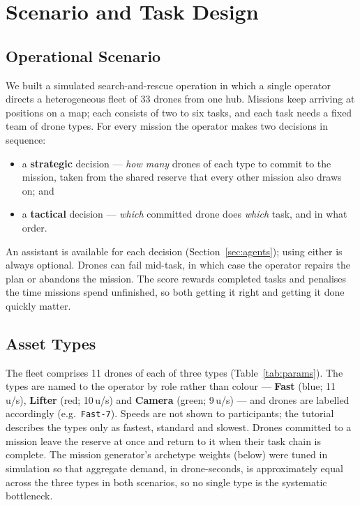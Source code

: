 \documentclass[10pt]{article}
\theoremstyle{definition}
\begin{document}
\section{Scenario and Task Design}\label{sec:task}

\subsection{Operational Scenario}

We built a simulated search-and-rescue operation in which a single operator directs a heterogeneous fleet of 33
drones from one hub. Missions keep arriving at positions on a map; each consists of two to six tasks, and each task
needs a fixed team of drone types. For every mission the operator makes two decisions in sequence:
\begin{itemize}[noitemsep]
  \item a \textbf{strategic} decision --- \emph{how many} drones of each type to commit to the mission, taken from
        the shared reserve that every other mission also draws on; and
  \item a \textbf{tactical} decision --- \emph{which} committed drone does \emph{which} task, and in what order.
\end{itemize}
An assistant is available for each decision (Section~\ref{sec:agents}); using either is always optional. Drones can
fail mid-task, in which case the operator repairs the plan or abandons the mission. The score rewards completed tasks
and penalises the time missions spend unfinished, so both getting it right and getting it done quickly matter.

\subsection{Asset Types}\label{sec:assets}

The fleet comprises 11 drones of each of three types (Table~\ref{tab:params}). The types are named to the operator by
role rather than colour --- \textbf{Fast} (blue; 11\,u/s), \textbf{Lifter} (red; 10\,u/s) and \textbf{Camera}
(green; 9\,u/s) --- and drones are labelled accordingly (e.g.\ \texttt{Fast-7}). Speeds are not shown to
participants; the tutorial describes the types only as fastest, standard and slowest. Drones committed to a mission
leave the reserve at once and return to it when their task chain is complete. The mission generator's archetype
weights (below) were tuned in simulation so that aggregate demand, in drone-seconds, is approximately equal across
the three types in both scenarios, so no single type is the systematic bottleneck.
\end{document}
